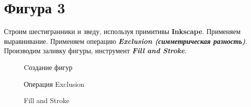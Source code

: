 \newpage
\section[Фигура 3]{Фигура 3}

Строим шестигранники и зведу, используя примитивы \textbf{Inkscape}.
Применяем выравнивание.
Применяем операцию \textit{\textbf{Exclusion (симметрическая разность)}}.
Производим заливку фигуры, инструмент \textit{\textbf{Fill and Stroke}}.
\begin{figure}[H]
    \begin{minipage}[h]{0.47\linewidth}
        Cоздание фигур\\
    \end{minipage}
    \hfill
    \begin{minipage}[h]{0.47\linewidth}
        Операция Exclusion\\
    \end{minipage}
    \hfill
    \centering
    \begin{minipage}[h]{0.47\linewidth}
        Fill and Stroke
    \end{minipage}
\end{figure}
